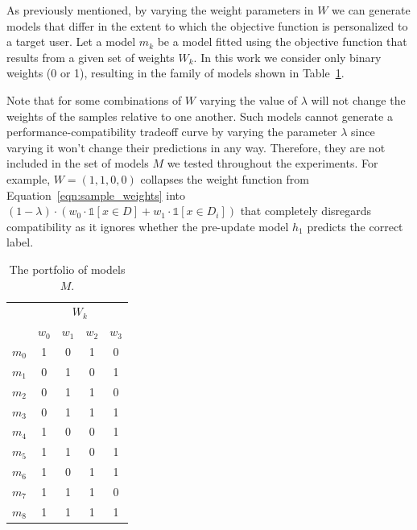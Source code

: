 \documentclass[letterpaper]{article} %
\theoremstyle{definition}
\newcommand{\kibitz}[2]{\ifnum\Comments=1{\color{#1}{#2}}\fi}
\newcommand{\ym}[1]{\kibitz{blue}{[YM:#1]}}
\newcommand{\li}[1]{\kibitz{brown}{[LL:#1]}}
\begin{document}
As previously mentioned, by varying the weight parameters in $W$ we can generate models that differ in the extent to which the objective function is personalized to a target user. Let a model $m_k$ be a model fitted using the objective function that results from a given set of weights $W_k$. In this work we consider only binary weights (0 or 1), resulting in the family of models shown in Table~\ref{tab:models}.

\li{I don't understand what comes next. Once we polish this explanation we should probably move it to the end of the previous paragraph. The reader will be asking the question of where are the other models in the table 1 as soon as we mention it.}\ym{moved it, but I'm not sure how to improve it} Note that for some combinations of $W$ varying the value of  $\lambda$ will not change the weights of the samples relative to one another. Such models cannot generate a performance-compatibility tradeoff curve by varying the parameter $\lambda$ since varying it won't change their predictions in any way. Therefore, they are not included in the set of models $M$ we tested throughout the experiments. For example, $W=(1,1,0,0)$ collapses the weight function from Equation~\ref{eqn:sample_weights} into $(1-\lambda)\cdot (w_0\cdot \mathbb{1}[x\in D]+w_1\cdot \mathbb{1}[x\in D_i])$ that completely disregards compatibility as it ignores whether the pre-update model $h_1$ predicts the correct label.

\begin{table}
\begin{center}
{
\setlength{\tabcolsep}{4pt}
\begin{tabular}{c|cccc}
\hline
\rule{0pt}{6pt}
\multirow{2}{*}{model}&\multicolumn{4}{c}{$W_k$}\\
&$w_0$&$w_1$&$w_2$&$w_3$
\rule{0pt}{6pt}
\\\hline
$m_0$&1&0&1&0\\
$m_1$&0&1&0&1\\
$m_2$&0&1&1&0\\
$m_3$&0&1&1&1\\
$m_4$&1&0&0&1\\
$m_5$&1&1&0&1\\
$m_6$&1&0&1&1\\
$m_7$&1&1&1&0\\
$m_8$&1&1&1&1
\\\hline
\end{tabular}
\caption{The portfolio of models $M$.}
\label{tab:models}}
\end{center}
\end{table}
\end{document}
